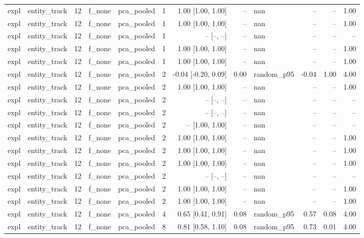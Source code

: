 \begin{tabular}{llrllrrrlrrr}
expl & entity\_track & 12 & f\_none & pca\_pooled & 1 & 1.00 [1.00, 1.00] & -- & nan & -- & -- & 1.00 \\
expl & entity\_track & 12 & f\_none & pca\_pooled & 1 & 1.00 [1.00, 1.00] & -- & nan & -- & -- & 1.00 \\
expl & entity\_track & 12 & f\_none & pca\_pooled & 1 & -- [--, --] & -- & nan & -- & -- & -- \\
expl & entity\_track & 12 & f\_none & pca\_pooled & 1 & 1.00 [1.00, 1.00] & -- & nan & -- & -- & 1.00 \\
expl & entity\_track & 12 & f\_none & pca\_pooled & 1 & 1.00 [1.00, 1.00] & -- & nan & -- & -- & 1.00 \\
expl & entity\_track & 12 & f\_none & pca\_pooled & 2 & -0.04 [-0.20, 0.09] & 0.00 & random\_p95 & -0.04 & 1.00 & 4.00 \\
expl & entity\_track & 12 & f\_none & pca\_pooled & 2 & 1.00 [1.00, 1.00] & -- & nan & -- & -- & 1.00 \\
expl & entity\_track & 12 & f\_none & pca\_pooled & 2 & -- [--, --] & -- & nan & -- & -- & -- \\
expl & entity\_track & 12 & f\_none & pca\_pooled & 2 & -- [--, --] & -- & nan & -- & -- & -- \\
expl & entity\_track & 12 & f\_none & pca\_pooled & 2 & -- [1.00, 1.00] & -- & nan & -- & -- & -- \\
expl & entity\_track & 12 & f\_none & pca\_pooled & 2 & 1.00 [1.00, 1.00] & -- & nan & -- & -- & 1.00 \\
expl & entity\_track & 12 & f\_none & pca\_pooled & 2 & 1.00 [1.00, 1.00] & -- & nan & -- & -- & 1.00 \\
expl & entity\_track & 12 & f\_none & pca\_pooled & 2 & 1.00 [1.00, 1.00] & -- & nan & -- & -- & 1.00 \\
expl & entity\_track & 12 & f\_none & pca\_pooled & 2 & -- [--, --] & -- & nan & -- & -- & -- \\
expl & entity\_track & 12 & f\_none & pca\_pooled & 2 & 1.00 [1.00, 1.00] & -- & nan & -- & -- & 1.00 \\
expl & entity\_track & 12 & f\_none & pca\_pooled & 2 & 1.00 [1.00, 1.00] & -- & nan & -- & -- & 1.00 \\
expl & entity\_track & 12 & f\_none & pca\_pooled & 4 & 0.65 [0.41, 0.91] & 0.08 & random\_p95 & 0.57 & 0.08 & 4.00 \\
expl & entity\_track & 12 & f\_none & pca\_pooled & 8 & 0.81 [0.58, 1.10] & 0.08 & random\_p95 & 0.73 & 0.01 & 4.00 \\

\end{tabular}
